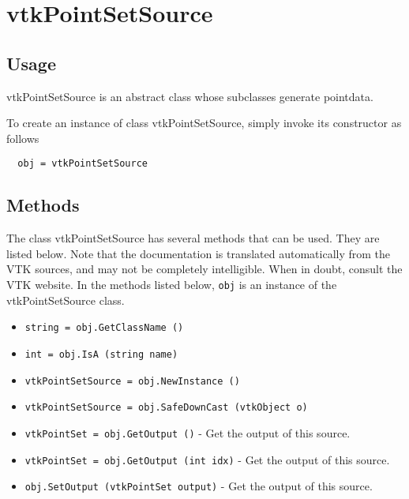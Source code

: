 \section{vtkPointSetSource}

\subsection{Usage}

 vtkPointSetSource is an abstract class whose subclasses generate pointdata.

To create an instance of class vtkPointSetSource, simply
invoke its constructor as follows
\begin{verbatim}
  obj = vtkPointSetSource
\end{verbatim}
\subsection{Methods}

The class vtkPointSetSource has several methods that can be used.
  They are listed below.
Note that the documentation is translated automatically from the VTK sources,
and may not be completely intelligible.  When in doubt, consult the VTK website.
In the methods listed below, \verb|obj| is an instance of the vtkPointSetSource class.
\begin{itemize}
\item  \verb|string = obj.GetClassName ()|

\item  \verb|int = obj.IsA (string name)|

\item  \verb|vtkPointSetSource = obj.NewInstance ()|

\item  \verb|vtkPointSetSource = obj.SafeDownCast (vtkObject o)|

\item  \verb|vtkPointSet = obj.GetOutput ()| -  Get the output of this source.

\item  \verb|vtkPointSet = obj.GetOutput (int idx)| -  Get the output of this source.

\item  \verb|obj.SetOutput (vtkPointSet output)| -  Get the output of this source.

\end{itemize}
